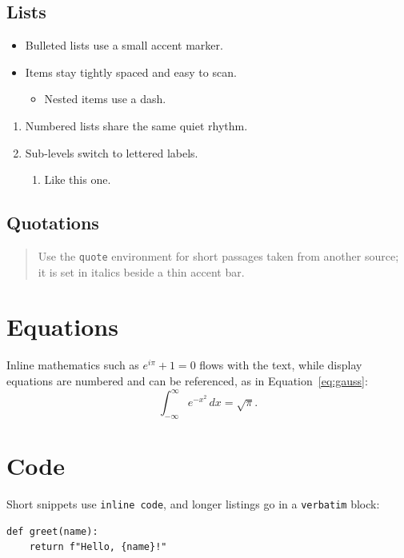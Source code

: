 \subsection{Lists}
\begin{itemize}
  \item Bulleted lists use a small accent marker.
  \item Items stay tightly spaced and easy to scan.
  \begin{itemize}
    \item Nested items use a dash.
  \end{itemize}
\end{itemize}

\begin{enumerate}
  \item Numbered lists share the same quiet rhythm.
  \item Sub-levels switch to lettered labels.
  \begin{enumerate}
    \item Like this one.
  \end{enumerate}
\end{enumerate}

\subsection{Quotations}
\begin{quote}
  Use the \texttt{quote} environment for short passages taken from another
  source; it is set in italics beside a thin accent bar.
\end{quote}

\section{Equations}
Inline mathematics such as $e^{i\pi} + 1 = 0$ flows with the text, while
display equations are numbered and can be referenced, as in
Equation~\eqref{eq:gauss}:
\begin{equation}\label{eq:gauss}
  \int_{-\infty}^{\infty} e^{-x^{2}}\,dx = \sqrt{\pi}.
\end{equation}

\section{Code}
Short snippets use \texttt{inline code}, and longer listings go in a
\texttt{verbatim} block:
\begin{verbatim}
def greet(name):
    return f"Hello, {name}!"
\end{verbatim}


